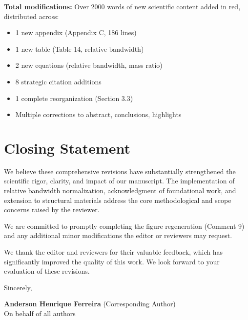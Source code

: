 \documentclass[11pt,a4paper]{article}
\begin{document}
\textbf{Total modifications:} Over 2000 words of new scientific content added in red, distributed across:
\begin{itemize}
    \item 1 new appendix (Appendix C, 186 lines)
    \item 1 new table (Table 14, relative bandwidth)
    \item 2 new equations (relative bandwidth, mass ratio)
    \item 8 strategic citation additions
    \item 1 complete reorganization (Section 3.3)
    \item Multiple corrections to abstract, conclusions, highlights
\end{itemize}

\section*{Closing Statement}

We believe these comprehensive revisions have substantially strengthened the scientific rigor, clarity, and impact of our manuscript. The implementation of relative bandwidth normalization, acknowledgment of foundational work, and extension to structural materials address the core methodological and scope concerns raised by the reviewer.

We are committed to promptly completing the figure regeneration (Comment 9) and any additional minor modifications the editor or reviewers may request.

We thank the editor and reviewers for their valuable feedback, which has significantly improved the quality of this work. We look forward to your evaluation of these revisions.

\vspace{1cm}

Sincerely,

\vspace{1cm}

\textbf{Anderson Henrique Ferreira} (Corresponding Author)\\
On behalf of all authors
\end{document}
